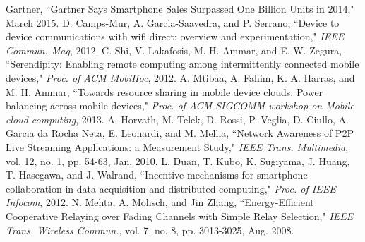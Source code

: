 \documentclass[journal,12pt, onecolumn]{IEEEtran}
\begin{document}
\begin{thebibliography}{31}
Gartner, ``Gartner Says Smartphone Sales Surpassed One Billion Units in 2014," March 2015.
D. Camps-Mur, A. Garcia-Saavedra, and P. Serrano, ``Device to device communications with wifi direct: overview and experimentation," \textit{IEEE Commun. Mag}, 2012. 
C. Shi, V. Lakafosis, M. H. Ammar, and E. W. Zegura, ``Serendipity: Enabling remote computing among intermittently connected mobile devices," \textit{Proc. of ACM MobiHoc}, 2012.
A. Mtibaa, A. Fahim, K. A. Harras, and M. H. Ammar, ``Towards resource sharing in mobile device clouds: Power balancing across mobile devices," \textit{Proc. of ACM SIGCOMM workshop on Mobile cloud computing}, 2013.
A. Horvath, M. Telek, D. Rossi, P. Veglia, D. Ciullo, A. Garcia da Rocha Neta, E. Leonardi, and M. Mellia, ``Network Awareness of P2P Live Streaming Applications: a Measurement Study," \textit{IEEE Trans. Multimedia}, vol. 12, no. 1, pp. 54-63, Jan. 2010. 
L. Duan, T. Kubo, K. Sugiyama, J. Huang, T. Hasegawa, and J. Walrand, ``Incentive mechanisms for smartphone collaboration in data acquisition and distributed computing," \textit{Proc. of IEEE Infocom}, 2012.
N. Mehta, A. Molisch, and Jin Zhang, ``Energy-Efficient Cooperative Relaying over Fading Channels with Simple Relay Selection," \textit{IEEE Trans. Wireless Commun.}, vol. 7, no. 8, pp. 3013-3025, Aug. 2008. 



\end{thebibliography}
\end{document}

